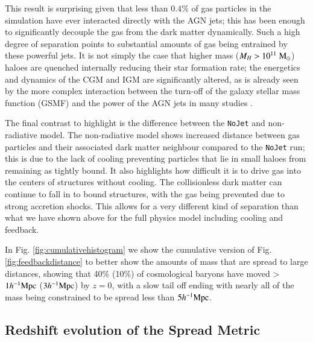 \documentclass[fleqn,usenatbib]{mnras}
\newcommand{\hmpc}{h^{-1}{\rm Mpc}}
\newcommand{\msolar}{\;{\rm M}_{\odot}}
\newcommand{\nojet}{{\tt NoJet}}
\begin{document}
This result is surprising given that less than $0.4\%$ of gas particles in
the simulation have ever interacted directly with the AGN jets; this has been
enough to significantly decouple the gas from the dark matter dynamically.
Such a high degree of separation points to substantial amounts of gas being
entrained by these powerful jets. It is not simply the case that higher mass
($M_H > 10^{11} \msolar{}$) haloes are quenched internally reducing their star
formation rate; the energetics and dynamics of the CGM and IGM are
significantly altered, as is already seen by the more complex interaction
between the turn-off of the galaxy stellar mass function (GSMF) and the power
of the AGN jets in many studies \citep{Weinberger2018, Dave2019}. 

The final contrast to highlight is the difference between the \nojet{} and
non-radiative model. The non-radiative model shows increased distance between
gas particles and their associated dark matter neighbour compared to the
\nojet{} run; this is due to the lack of cooling preventing particles that
lie in small haloes from remaining as tightly bound. It also highlights how
difficult it is to drive gas into the centers of structures without cooling.
The collisionless dark matter can continue to fall in to bound structures,
with the gas being prevented due to strong accretion shocks. This allows for
a very different kind of separation than what we have shown above for the
full physics model including cooling and feedback.


In Fig. \ref{fig:cumulativehistogram} we show the cumulative version of Fig.
\ref{fig:feedbackdistance} to better show the amounts of mass that are spread
to large distances, showing that 40\% (10\%) of cosmological baryons have
moved > $1\hmpc{}$ ($3\hmpc{}$) by $z = 0$, with a slow tail off ending with
nearly all of the mass being constrained to be spread less than $5\hmpc{}$.



\subsection{Redshift evolution of the Spread Metric}
\end{document}
